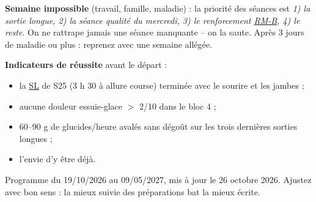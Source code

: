 \documentclass[10pt,a4paper]{article}
\newcommand{\rmb}{\hyperlink{rm-b}{RM-B}}
\newcommand{\sln}{\hyperlink{legende}{SL}}
\begin{document}
\textbf{Semaine impossible} (travail, famille, maladie) :
la priorit\'e des s\'eances est \emph{1) la sortie longue, 2) la s\'eance
qualit\'e du mercredi, 3) le renforcement \rmb{}, 4) le reste}. On ne rattrape
jamais une s\'eance manquante -- on la saute. Apr\`es 3 jours de maladie ou
plus : reprenez avec une semaine all\'eg\'ee.

\textbf{Indicateurs de r\'eussite} avant le d\'epart :
\begin{itemize}
\item la \sln{} de S25 (3 h 30 \`a allure course) termin\'ee avec le sourire et
les jambes ;
\item aucune douleur essuie-glace $>$ 2/10 dans le bloc 4 ;
\item 60--90 g de glucides/heure aval\'es sans d\'ego\^ut sur les trois
derni\`eres sorties longues ;
\item l'envie d'y \^etre d\'ej\`a.
\end{itemize}

\vfill
\begin{center}\footnotesize\color{grey1}
Programme du 19/10/2026 au 09/05/2027, mis \`a jour le 26 octobre 2026.
Ajustez avec bon sens : la mieux suivie des pr\'eparations bat la mieux \'ecrite.
\end{center}
\end{document}
